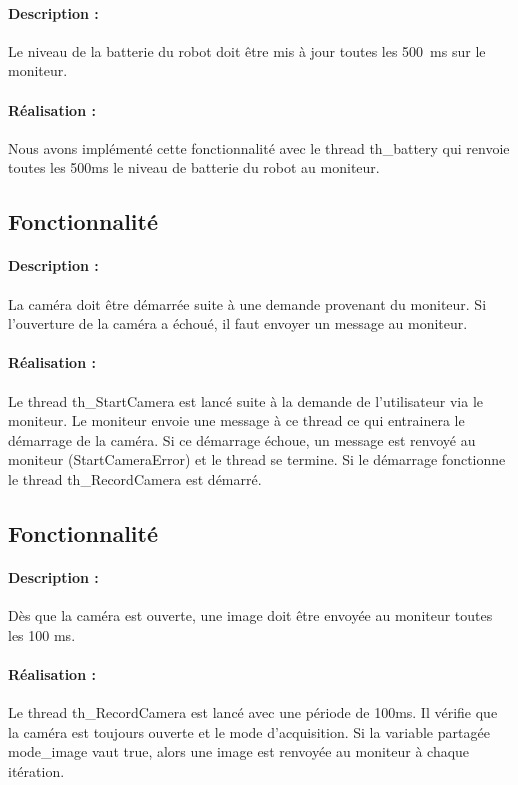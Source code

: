 \documentclass[11pt, a4paper]{paper}
\newcounter{cptreq}
\begin{document}
{{\paragraph{Description :} Le niveau de la batterie du robot doit être mis à jour toutes les 500~ms sur le moniteur.

\paragraph{\color{black}Réalisation :}  {\color{black} Nous avons implémenté cette fonctionnalité avec le thread th\_battery qui renvoie toutes les 500ms le niveau de batterie du robot au moniteur.}
\subsection{Fonctionnalité \thecptreq}

\paragraph{Description :} La caméra doit être démarrée suite à une demande provenant du moniteur. Si l'ouverture de la  caméra a échoué, il faut envoyer un message au moniteur.

\paragraph{\color{black}Réalisation :}  {\color{black} Le thread th\_StartCamera est lancé suite à la demande de l'utilisateur via le moniteur. Le moniteur envoie une message à ce thread ce qui entrainera le démarrage de la caméra. Si ce démarrage échoue, un message est renvoyé au moniteur (StartCameraError) et le thread se termine. Si le démarrage fonctionne le thread th\_RecordCamera est démarré.}
\subsection{Fonctionnalité \thecptreq}

\paragraph{Description :} Dès que la caméra est ouverte, une image doit être envoyée au moniteur toutes les 100 ms.

\paragraph{\color{black}Réalisation :}  {\color{black} Le thread th\_RecordCamera est lancé avec une période de 100ms. Il vérifie que la caméra est toujours ouverte et le mode d'acquisition. Si la variable partagée mode\_image vaut true, alors une image est renvoyée au moniteur à chaque itération.}
}}
\end{document}
